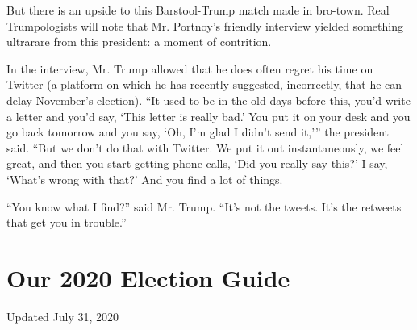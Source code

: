 But there is an upside to this Barstool-Trump match made in bro-town.
Real Trumpologists will note that Mr. Portnoy's friendly interview
yielded something ultrarare from this president: a moment of contrition.

In the interview, Mr. Trump allowed that he does often regret his time
on Twitter (a platform on which he has recently suggested,
\href{https://www.nytimes.com/2020/07/30/us/politics/trump-postpone-election.html}{incorrectly},
that he can delay November's election). ``It used to be in the old days
before this, you'd write a letter and you'd say, `This letter is really
bad.' You put it on your desk and you go back tomorrow and you say, `Oh,
I'm glad I didn't send it,''' the president said. ``But we don't do that
with Twitter. We put it out instantaneously, we feel great, and then you
start getting phone calls, `Did you really say this?' I say, `What's
wrong with that?' And you find a lot of things.

``You know what I find?'' said Mr. Trump. ``It's not the tweets. It's
the retweets that get you in trouble.''

\hypertarget{our-2020-election-guide}{%
\section{Our 2020 Election Guide}\label{our-2020-election-guide}}

Updated July 31, 2020

